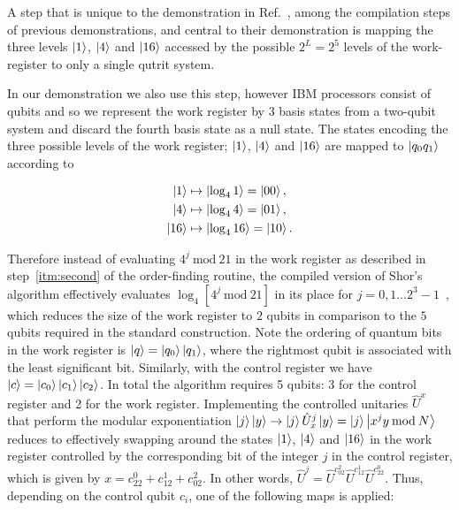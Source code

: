 \bigskip
\noindent
A step that is unique to the demonstration in Ref.~\cite{Lopez_2012}, among the compilation steps of previous demonstrations, and central to their demonstration is mapping the three levels $\ket{1}$, $\ket{4}$ and $\ket{16}$ accessed by the possible $2^L=2^5$ levels of the work-register to only a single qutrit system. 

\clearpage
\noindent
In our demonstration we also use this step, however IBM processors consist of qubits and so we represent the work register by 3 basis states from a two-qubit system and discard the fourth basis state as a null state. The states encoding the three possible levels of the work register; $\ket{1}$, $\ket{4}$ and $\ket{16}$ are mapped to $\ket{q_0q_1}$ according to

\begin{align}
    \ket{1}  & \mapsto \ket{\log_{4}1}  =\ket{00}, \nonumber \\
    \ket{4}  & \mapsto \ket{\log_{4}4}  =\ket{01}, \nonumber \\
    \ket{16} & \mapsto \ket{\log_{4}16} =\ket{10}.
\end{align}

\noindent
Therefore instead of evaluating $4^j\>\text{mod}\>21$ in the work register as described in step~\ref{itm:second} of the order-finding routine, the compiled version of Shor's algorithm effectively evaluates $\log_{4}[4^j\>\text{mod}\>21]$ in its place for $j = 0,1\dots2^3-1$~\cite{Beckman_1996}, which reduces the size of the work register to $2$ qubits in comparison to the $5$ qubits required in the standard construction. Note the ordering of quantum bits in the work register is $\ket{q} = \ket{q_0}\ket{q_1}$, where the rightmost qubit is associated with the least significant bit. Similarly, with the control register we have $\ket{c} = \ket{c_0}\ket{c_1}\ket{c_2}$. In total the algorithm requires 5 qubits: 3 for the control register and 2 for the work register. Implementing the controlled unitaries $\hat{U}^x$ that perform the modular exponentiation $\ket{j}\ket{y} \to \ket{j}\hat{U}^j_x\ket{y}=\ket{j}\ket{x^j y\>\text{mod}\>N}$ reduces to effectively swapping around the states $\ket{1}$, $\ket{4}$ and $\ket{16}$ in the work register controlled by the corresponding bit of the integer $j$ in the control register, which is given by $x=c_22^0 + c_12^1 + c_02^2$. In other words, $\hat{U}^j=\hat{U}^{c_02^2}\hat{U}^{c_12^1}\hat{U}^{c_22^0}$. Thus, depending on the control qubit $c_i$, one of the following maps is applied:

